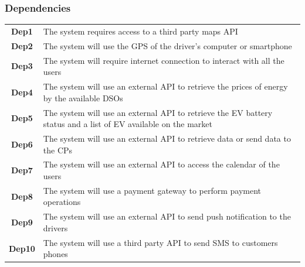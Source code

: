 \subsubsection{Dependencies}
\begin{table}[H]
      \begin{tabularx}{\textwidth}{cX}
            \toprule
            \textbf{Dep1}         & The system requires access to a third party maps API                                                                                             \\
            \textbf{Dep2}         & The system will use the GPS of the driver's computer or smartphone                                                                               \\
            \textbf{Dep3}         & The system will require internet connection to interact with all the users                                                                       \\
            \textbf{Dep4}         & The system will use an external API to retrieve the prices of energy by the available DSOs                                                       \\
            \textbf{Dep5}         & The system will use an external API to retrieve the EV battery status and a list of EV available on the market                                   \\
            \textbf{Dep6}         & The system will use an external API to retrieve data or send data to the CPs                                                                     \\
            \textbf{Dep7}         & The system will use an external API to access the calendar of the users                                                                          \\
            \textbf{Dep8}         & The system will use a payment gateway to perform payment operations                                                                              \\
            \textbf{Dep9}        & The system will use an external API to send push notification to the drivers                                                                     \\
            \textbf{Dep10}        & The system will use a third party API to send SMS to customers phones                                                                            \\
            \bottomrule
      \end{tabularx}
\end{table}
